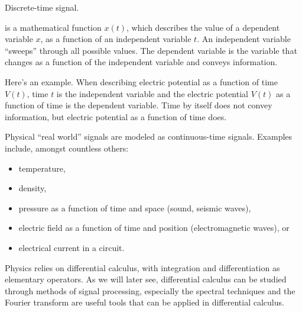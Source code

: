 \begin{marginfigure}%
   \begin{center}
   \end{center}
   \caption{Discrete-time signal.}
   \label{fig:dtfig}
\end{marginfigure}


 is a mathematical function $x(t)$, 
which describes the value of a  dependent variable $x$, 
as a function of an independent variable $t$. 
An independent variable ``sweeps'' through all possible values. 
The dependent variable is the variable that changes as a function of 
the independent variable and conveys information.

Here's an example. When describing electric potential as a function of time $V(t)$, 
time $t$ is the independent variable and the electric potential $V(t)$ as a 
function of time is the dependent variable. Time by itself does not convey 
information, but electric potential as a function of time does.

Physical ``real world'' signals are modeled as continuous-time signals. 
Examples include, amongst countless others:
\begin{itemize}
   \setlength\itemsep{0.25em}
   \item temperature,
   \item density,
   \item pressure as a function of time and space (sound, seismic waves),
   \item electric field as a function of time and position
         (electromagnetic waves), or
   \item electrical current in a circuit.
\end{itemize}
Physics relies on differential calculus, with integration and differentiation as elementary operators. 
As we will later see, differential calculus can be studied through methods of signal processing, 
especially the spectral techniques and the Fourier transform are useful tools 
that can be applied in differential calculus.

